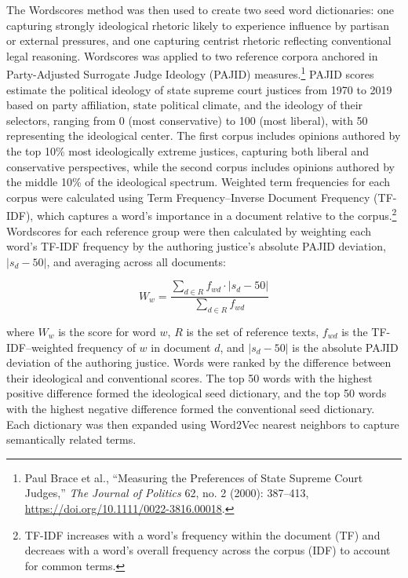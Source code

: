 The Wordscores method was then used to create two seed word
dictionaries: one capturing strongly ideological rhetoric likely to
experience influence by partisan or external pressures, and one
capturing centrist rhetoric reflecting conventional legal reasoning.
Wordscores was applied to two reference corpora anchored in
Party-Adjusted Surrogate Judge Ideology (PAJID) measures.\footnote{Paul
  Brace et al., {``Measuring the {Preferences} of {State Supreme Court
  Judges},''} \emph{The Journal of Politics} 62, no. 2 (2000): 387--413,
  \url{https://doi.org/10.1111/0022-3816.00018}.} PAJID scores estimate
the political ideology of state supreme court justices from 1970 to 2019
based on party affiliation, state political climate, and the ideology of
their selectors, ranging from 0 (most conservative) to 100 (most
liberal), with 50 representing the ideological center. The first corpus
includes opinions authored by the top 10\% most ideologically extreme
justices, capturing both liberal and conservative perspectives, while
the second corpus includes opinions authored by the middle 10\% of the
ideological spectrum. Weighted term frequencies for each corpus were
calculated using Term Frequency--Inverse Document Frequency (TF-IDF),
which captures a word's importance in a document relative to the
corpus.\footnote{TF-IDF increases with a word's frequency within the
  document (TF) and decreaes with a word's overall frequency across the
  corpus (IDF) to account for common terms.} Wordscores for each
reference group were then calculated by weighting each word's TF-IDF
frequency by the authoring justice's absolute PAJID deviation,
\(|s_d - 50|\), and averaging across all documents:

\[W_w = \frac{\sum_{d \in R} f_{wd} \cdot |s_d - 50|}{\sum_{d \in R} f_{wd}}\]

where \(W_w\) is the score for word \(w\), \(R\) is the set of reference
texts, \(f_{wd}\) is the TF-IDF--weighted frequency of \(w\) in document
\(d\), and \(|s_d - 50|\) is the absolute PAJID deviation of the
authoring justice. Words were ranked by the difference between their
ideological and conventional scores. The top 50 words with the highest
positive difference formed the ideological seed dictionary, and the top
50 words with the highest negative difference formed the conventional
seed dictionary. Each dictionary was then expanded using Word2Vec
nearest neighbors to capture semantically related terms.

